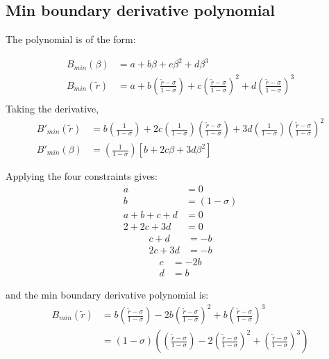 \subsection{Min boundary derivative polynomial}

The polynomial is of the form: 

\begin{align*}
    B_{min} \left( \beta \right) &= 
    a + b \beta + c \beta^2 + d \beta^3                   \\
    B_{min} \left( \widetilde{r} \right) &= 
    a + b \left( \frac{\widetilde{r} - \sigma}{1 - \sigma} \right)+
    c\left( \frac{\widetilde{r} - \sigma}{1 - \sigma} \right)  ^2+
    d\left( \frac{\widetilde{r} - \sigma}{1 - \sigma} \right)^3                    \\
\end{align*}
Taking the derivative,
\begin{align*}
    B'_{min} \left( \widetilde{r} \right) &= 
    b \left( \frac{1}{1 - \sigma} \right)+
    2 c\left( \frac{1}{1 - \sigma} \right)\left( \frac{\widetilde{r} - \sigma}{1 - \sigma} \right)  +
    3 d\left( \frac{1}{1-\sigma} \right)\left( \frac{\widetilde{r} - \sigma}{1 - \sigma} \right)^2\\
    B'_{min} \left( \beta \right) &= 
    \left( \frac{1}{1 - \sigma} \right)
    \left[
    b +
    2 c \beta + 
    3 d \beta^2
    \right]
\end{align*}


Applying the four constraints gives:
\begin{align*}
    a &= 0\\
    b &= \left( 1 - \sigma \right) \\
    a + b + c + d &= 0\\
    2 + 2c + 3d &= 0
\end{align*}
\begin{align*}
    c + d &= -b  \\
    2c + 3d &= -b
\end{align*}
\begin{align*}
    c &= -2b \\
    d &= b
\end{align*}

and the min boundary derivative polynomial is: 
\begin{align*}
    B_{min}\left( \widetilde{r} \right) &= 
    b \left( \frac{\widetilde{r} - \sigma }{1 - \sigma}\right) -
    2b\left( \frac{\widetilde{r} - \sigma }{1 - \sigma}\right) ^2 +
    b \left( \frac{\widetilde{r} - \sigma }{1 - \sigma}\right)^3 \\
    &=  \left( 1 - \sigma \right)
    \left( \left( \frac{\widetilde{r} - \sigma }{1 - \sigma}\right)  - 
    2\left( \frac{\widetilde{r} - \sigma }{1 - \sigma}\right)^2 +
    \left( \frac{\widetilde{r} - \sigma }{1 - \sigma}\right)^3\right)
\end{align*} 

